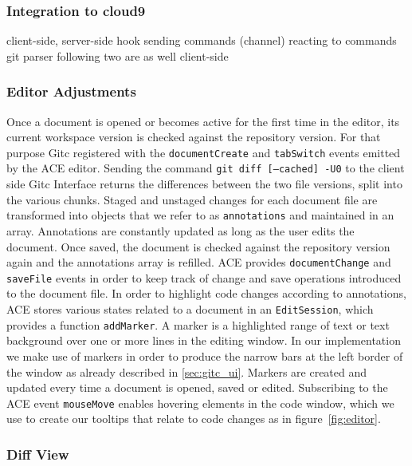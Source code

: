 \subsubsection{Integration to cloud9}
client-side, server-side hook
sending commands (channel)
reacting to commands
git parser
following two are as well client-side

\subsubsection{Editor Adjustments}

Once a document is opened or becomes active for the first time in the editor, its current workspace version is checked against the repository version. 
For that purpose Gitc registered with the \texttt{documentCreate} and \texttt{tabSwitch} events emitted by the ACE editor. 
Sending the command \texttt{git diff [--cached] -U0} to the client side Gitc Interface returns the differences between the two file versions, split into the various chunks. 
Staged and unstaged changes for each document file are transformed into objects that we refer to as \texttt{annotations} and maintained in an array. Annotations are constantly updated as long as the user edits the document. 
Once saved, the document is checked against the repository version again and the annotations array is refilled. 
ACE provides \texttt{documentChange} and \texttt{saveFile} events in order to keep track of change and save operations introduced to the document file. 
In order to highlight code changes according to annotations, ACE stores various states related to a document in an \texttt{EditSession}, which provides a function \texttt{addMarker}. 
A marker is a highlighted range of text or text background over one or more lines in the editing window. 
In our implementation we make use of markers in order to produce the narrow bars at the left border of the window as already described in \ref{sec:gitc_ui}. 
Markers are created and updated every time a document is opened, saved or edited. 
Subscribing to the ACE event \texttt{mouseMove} enables hovering elements in the code window, which we use to create our tooltips that relate to code changes as in figure~\ref{fig:editor}.

\subsubsection{Diff View}
